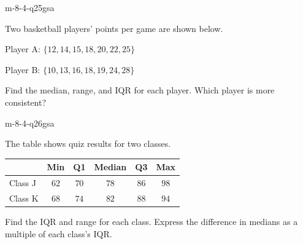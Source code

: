 \begin{practiceQuestion}{m-8-4-q25}{gsa}
\begin{questionText}
Two basketball players' points per game are shown below.

Player A: $\{12, 14, 15, 18, 20, 22, 25\}$

Player B: $\{10, 13, 16, 18, 19, 24, 28\}$

Find the median, range, and IQR for each player. Which player is more consistent?
\end{questionText}
\end{practiceQuestion}

\begin{practiceQuestion}{m-8-4-q26}{gsa}
\begin{questionText}
The table shows quiz results for two classes.

\begin{center}
\begin{tabular}{|l|c|c|c|c|c|}
\hline
& \textbf{Min} & \textbf{Q1} & \textbf{Median} & \textbf{Q3} & \textbf{Max} \\
\hline
Class J & $62$ & $70$ & $78$ & $86$ & $98$ \\
Class K & $68$ & $74$ & $82$ & $88$ & $94$ \\
\hline
\end{tabular}
\end{center}

Find the IQR and range for each class. Express the difference in medians as a multiple of each class's IQR.
\end{questionText}
\end{practiceQuestion}

